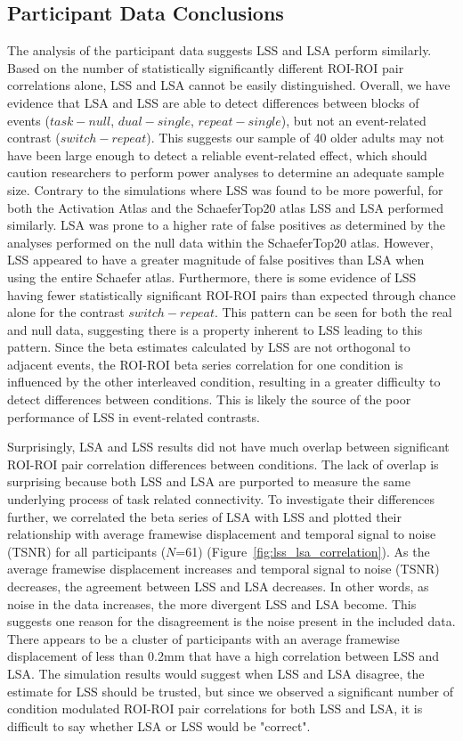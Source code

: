 \documentclass[phd,figures,tables,ackpage,abstractpage,publicabstractpage]{uithesis}
\begin{document}
\subsection{Participant Data Conclusions}
\label{discussion:taskswitching-conclusions}

The analysis of the participant data suggests LSS and LSA perform similarly.
Based on the number of statistically significantly different ROI-ROI pair correlations alone,
LSS and LSA cannot be easily distinguished.
Overall, we have evidence that LSA and LSS are able to detect differences between
blocks of events ($task - null$, $dual - single$, $repeat - single$), but not an event-related contrast ($switch - repeat$).
This suggests our sample of 40 older adults may not have been large enough to detect a reliable event-related effect,
which should caution researchers to perform power analyses to determine an adequate sample size.
Contrary to the simulations where LSS was found to be more powerful,
for both the Activation Atlas and the SchaeferTop20 atlas LSS and LSA performed similarly.
LSA was prone to a higher rate of false positives as determined by the analyses performed on the null data within the SchaeferTop20 atlas.
However, LSS appeared to have a greater magnitude of false positives than LSA when using the entire Schaefer atlas.
Furthermore, there is some evidence of LSS having fewer statistically significant ROI-ROI pairs than expected through chance alone
for the contrast $switch - repeat$.
This pattern can be seen for both the real and null data, suggesting there is a property inherent to LSS
leading to this pattern.
Since the beta estimates calculated by LSS are not orthogonal to adjacent events,
the ROI-ROI beta series correlation for one condition is influenced by the other interleaved condition,
resulting in a greater difficulty to detect differences between conditions.
This is likely the source of the poor performance of LSS in event-related contrasts.

Surprisingly, LSA and LSS results did not have much overlap between significant
ROI-ROI pair correlation differences between conditions.
The lack of overlap is surprising because both LSS and LSA are purported to
measure the same underlying process of task related connectivity.
To investigate their differences further, we correlated the beta series of LSA with LSS and plotted their relationship with
average framewise displacement and temporal signal to noise (TSNR) for all participants ($N$=61) (Figure~\ref{fig:lss_lsa_correlation}).
As the average framewise displacement increases and temporal signal to noise (TSNR)
decreases, the agreement between LSS and LSA decreases.
In other words, as noise in the data increases, the more divergent LSS and LSA become.
This suggests one reason for the disagreement is the noise present in the included
data.
There appears to be a cluster of participants with an average framewise displacement of
less than 0.2mm that have a high correlation between LSS and LSA.
The simulation results would suggest when LSS and LSA disagree, the estimate for LSS should be
trusted, but since we observed a significant number of condition modulated ROI-ROI pair correlations for both
LSS and LSA, it is difficult to say whether LSA or LSS would be "correct".
\end{document}
